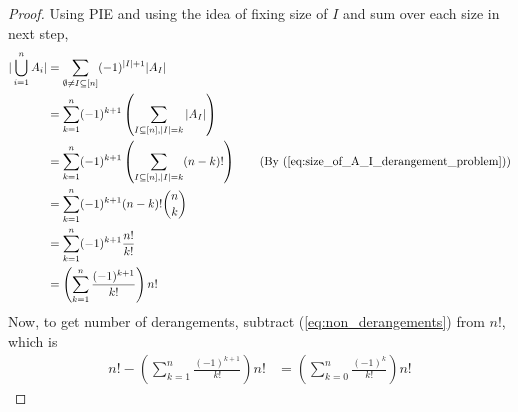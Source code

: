\begin{proof}
Using PIE and using the idea of fixing size of $I$ and sum over each size in next step,
\begin{align}
|\bigcup_{i=1}^{n} A_i| &= \sum_{\emptyset \neq I \subseteq [n]} (-1)^{|I|+1} |A_I|\nonumber \\
&= \sum_{k=1}^{n} (-1)^{k+1} \left(\sum_{I\subseteq [n],|I|=k} |A_I|\right)\nonumber \\
&= \sum_{k=1}^{n} (-1)^{k+1} \left(\sum_{I\subseteq [n],|I|=k} (n-k)!\right)\nonumber \tag{By (\ref{eq:size_of_A_I_derangement_problem})}\\
&= \sum_{k=1}^{n} (-1)^{k+1} (n-k)! {n \choose k}\nonumber \\
&= \sum_{k=1}^{n} (-1)^{k+1} \frac{n!} {k!}\nonumber \\
&=  \left(\sum_{k=1}^{n}  \frac{(-1)^{k+1}} {k!}\right)n! \label{eq:non_derangements}
\end{align}
Now, to get number of derangements, subtract (\ref{eq:non_derangements}) from $n!$, which is 
\begin{align*}
n! - \left(\sum_{k=1}^{n}  \frac{(-1)^{k+1}} {k!}\right)n! &= \left(\sum_{k=0}^{n} \frac{(-1)^k}{k!}\right)n!
\end{align*}
\end{proof}

